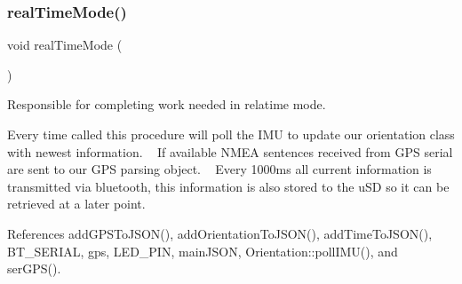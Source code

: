 \mbox{\label{logging-device_8ino_ab4c1c4c0fa047e336f9f4176406a54f1}} 
\subsubsection{\texorpdfstring{real\+Time\+Mode()}{realTimeMode()}}
{\footnotesize\ttfamily void real\+Time\+Mode (\begin{DoxyParamCaption}{ }\end{DoxyParamCaption})}



Responsible for completing work needed in relatime mode. 

Every time called this procedure will poll the I\+MU to update our orientation class with newest information. ~\newline
If available N\+M\+EA sentences received from G\+PS serial are sent to our G\+PS parsing object. ~\newline
 Every 1000ms all current information is transmitted via bluetooth, this information is also stored to the u\+SD so it can be retrieved at a later point. 

References add\+G\+P\+S\+To\+J\+S\+O\+N(), add\+Orientation\+To\+J\+S\+O\+N(), add\+Time\+To\+J\+S\+O\+N(), B\+T\+\_\+\+S\+E\+R\+I\+AL, gps, L\+E\+D\+\_\+\+P\+IN, main\+J\+S\+ON, Orientation\+::poll\+I\+M\+U(), and ser\+G\+P\+S().


